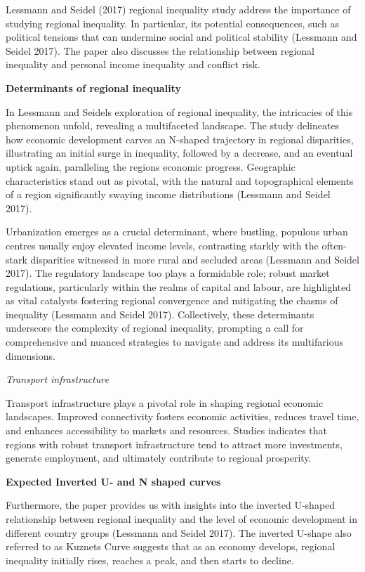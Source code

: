 \documentclass[
  a4paper,
  DIV=11,
  numbers=noendperiod]{scrartcl}
\begin{document}
Lessmann and Seidel (2017) regional inequality study address the
importance of studying regional inequality. In particular, its potential
consequences, such as political tensions that can undermine social and
political stability (Lessmann and Seidel 2017). The paper also discusses
the relationship between regional inequality and personal income
inequality and conflict risk.

\textbf{Determinants of regional inequality}

In Lessmann and Seidel\textquotesingle s exploration of regional
inequality, the intricacies of this phenomenon unfold, revealing a
multifaceted landscape. The study delineates how economic development
carves an N-shaped trajectory in regional disparities, illustrating an
initial surge in inequality, followed by a decrease, and an eventual
uptick again, paralleling the region\textquotesingle s economic
progress. Geographic characteristics stand out as pivotal, with the
natural and topographical elements of a region significantly swaying
income distributions (Lessmann and Seidel 2017).

Urbanization emerges as a crucial determinant, where bustling, populous
urban centres usually enjoy elevated income levels, contrasting starkly
with the often-stark disparities witnessed in more rural and secluded
areas (Lessmann and Seidel 2017). The regulatory landscape too plays a
formidable role; robust market regulations, particularly within the
realms of capital and labour, are highlighted as vital catalysts
fostering regional convergence and mitigating the chasms of inequality
(Lessmann and Seidel 2017). Collectively, these determinants underscore
the complexity of regional inequality, prompting a call for
comprehensive and nuanced strategies to navigate and address its
multifarious dimensions.

\emph{Transport infrastructure}

Transport infrastructure plays a pivotal role in shaping regional
economic landscapes. Improved connectivity fosters economic activities,
reduces travel time, and enhances accessibility to markets and
resources. Studies indicates that regions with robust transport
infrastructure tend to attract more investments, generate employment,
and ultimately contribute to regional prosperity.

\textbf{Expected Inverted U- and N shaped curves}

Furthermore, the paper provides us with insights into the inverted
U-shaped relationship between regional inequality and the level of
economic development in different country groups (Lessmann and Seidel
2017). The inverted U-shape also referred to as Kuznets Curve suggests
that as an economy develops, regional inequality initially rises,
reaches a peak, and then starts to decline.
\end{document}
